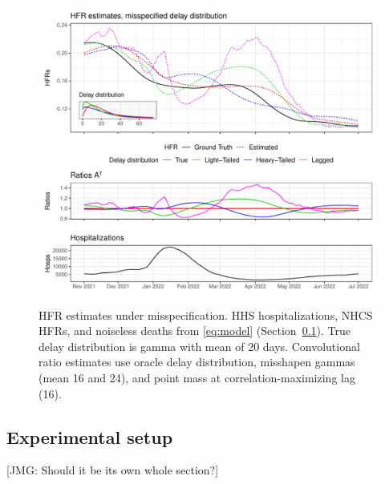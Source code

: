 \documentclass{article}
\newcommand{\djmcomment}[1]{{\color{teal}[DJM: #1]}}
\newcommand{\jmgcomment}[1]{{\color{cyan}[JMG: #1]}}
\begin{document}
\begin{figure}
    \centering
    \includegraphics[width=.8\linewidth]{Figs/Simulated/toy_misp.pdf}
    \caption{HFR estimates under misspecification. HHS hospitalizations, NHCS HFRs, and noiseless deaths from \eqref{eq:model} (Section~\ref{sec:setup}). True delay distribution is gamma with mean of 20 days. 
    Convolutional ratio estimates use oracle delay distribution, misshapen gammas (mean 16 and 24), and point mass at correlation-maximizing lag (16).}%
    \label{fig:misspecified}
\end{figure}



\subsection{Experimental setup}\label{sec:setup}
\jmgcomment{Should it be its own whole section?}
\end{document}
